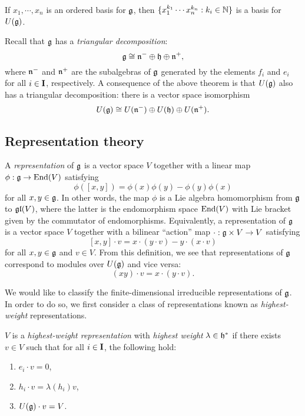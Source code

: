 \begin{theorem}\label{T:PBW-g}
    If $x_1,\cdots,x_n$ is an ordered basis for $\mathfrak{g}$, then $\{x_1^{k_1}\cdots x_n^{k_n} : k_i\in\mathbb{N}\}$ is a basis for $U(\mathfrak{g})$.
\end{theorem}

Recall that $\mathfrak{g}$ has a \emph{triangular decomposition}:
\[\mathfrak{g} \cong \mathfrak{n}^-\oplus\mathfrak{h}\oplus\mathfrak{n}^+,\]
where $\mathfrak{n}^-$ and $\mathfrak{n}^+$ are the subalgebras of $\mathfrak{g}$ generated by the elements $f_i$ and $e_i$ for all $i\in\mathbf{I}$, respectively.
A consequence of the above theorem is that $U(\mathfrak{g})$ also has a triangular decomposition: there is a vector space isomorphism
\[U(\mathfrak{g}) \cong U(\mathfrak{n}^-)\oplus U(\mathfrak{h}) \oplus U(\mathfrak{n}^+).\]


\subsection{Representation theory}

A \emph{representation} of $\mathfrak{g}$ is a vector space $V$ together with a linear map $\phi:\mathfrak{g}\to\operatorname{End}(V)$ satisfying
\[\phi([x,y]) = \phi(x)\phi(y)-\phi(y)\phi(x)\]
for all $x,y\in\mathfrak{g}$.
In other words, the map $\phi$ is a Lie algebra homomorphism from $\mathfrak{g}$ to $\mathfrak{gl}(V)$, where the latter is the endomorphism space $\operatorname{End}(V)$ with Lie bracket given by the commutator of endomorphisms.
Equivalently, a representation of $\mathfrak{g}$ is a vector space $V$ together with a bilinear ``action'' map $\cdot:\mathfrak{g}\times V\to V$ satisfying
\[[x,y]\cdot v = x\cdot(y\cdot v) - y\cdot(x\cdot v)\]
for all $x,y\in\mathfrak{g}$ and $v\in V$.
From this definition, we see that representations of $\mathfrak{g}$ correspond to modules over $U(\mathfrak{g})$ and vice versa:
\[(xy)\cdot v = x\cdot (y\cdot v).\]

We would like to classify the finite-dimensional irreducible representations of $\mathfrak{g}$.
In order to do so, we first consider a class of representations known as \emph{highest-weight} representations.

\begin{definition}\label{D:hw-g}
    $V$ is a \emph{highest-weight representation} with \emph{highest weight} $\lambda\in\mathfrak{h}^*$ if there exists $v\in V$ such that for all $i\in\mathbf{I}$, the following hold:
    \begin{enumerate}
        \item $e_i\cdot v = 0$,
        \item $h_i\cdot v = \lambda(h_i)v$,
        \item $U(\mathfrak{g})\cdot v = V$.
    \end{enumerate}
\end{definition}

